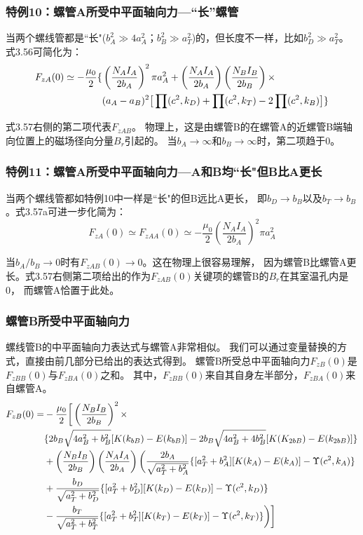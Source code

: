 \subsubsection{特例10：螺管A所受中平面轴向力---``长''螺管}
当两个螺线管都是``长"($b_A^2\gg 4a_A^2；b_B^2\gg a_T^2$)的，但长度不一样，比如$b_D^2\gg a_T^2$。
式3.56可简化为：
\begin{align}
F_{zA}(0)\simeq -\frac{\mu_0}{2}\{&\left(\frac{N_AI_A}{2b_A}\right)^2\pi a_A^2+\left(\frac{N_AI_A}{2b_A}\right)\left(\frac{N_BI_B}{2b_{B}}\right)\times\\\notag
&(a_A-a_B)^2\big[\prod(c^2,k_D)+\prod(c^2,k_T)-2\prod(c^2,k_B)\big]\}
\end{align}

式3.57右侧的第二项代表$F_{zAB}$。
物理上，这是由螺管B的在螺管A的近螺管B端轴向位置上的磁场径向分量$B_r$引起的。
当$b_A\rightarrow \infty$和$b_B\rightarrow \infty$时，第二项趋于0。

\subsubsection{特例11：螺管A所受中平面轴向力---A和B均``长"但B比A更长}
当两个螺线管都如特例10中一样是``长"的但B远比A更长，
即$b_D\rightarrow b_B$以及$b_T\rightarrow b_B$。式3.57a可进一步化简为：
\begin{equation*}
F_{zA}(0)\simeq F_{zAA}(0)\simeq -\frac{\mu_0}{2}\left(\frac{N_AI_A}{2b_A}\right)^2\pi a_A^2 \tag{3.57'}
\end{equation*}

当$b_A/b_B\rightarrow 0$时有$F_{zAB}(0)\rightarrow 0$。这在物理上很容易理解，
因为螺管B比螺管A更长。式3.57右侧第二项给出的作为$F_{zAB}(0)$关键项的螺管B的$B_r$在其室温孔内是0，
而螺管A恰置于此处。

\subsubsection{螺管B所受中平面轴向力}
螺线管B的中平面轴向力表达式与螺管A非常相似。
我们可以通过变量替换的方式，直接由前几部分已给出的表达式得到。
螺管B所受总中平面轴向力$F_{zB}(0)$是$F_{zBB}(0)$与$F_{zBA}(0)$之和。
其中，$F_{zBB}(0)$来自其自身左半部分，$F_{zBA}(0)$来自螺管A。
\begin{align}
F_{zB}(0)=&-\frac{\mu_0}{2}\bigg[\left(\frac{N_BI_B}{2b_B}\right)^2\times\\\notag
&\{2b_B\sqrt{4a_B^2+b_B^2}[K(k_{bB})-E(k_{bB})]-2b_B\sqrt{4a_B^2+4b_B^2}[K(K_{2bB})-E(k_{2bB})]\}\\\notag
&+\left(\frac{N_BI_B}{2b_B}\right)\left(\frac{N_AI_A}{2b_A}\right)\bigg(\frac{2b_A}{\sqrt{a_T^2+b_A^2}}\{[a_T^2+b_A^2][K(k_A)-E(k_A)]-\Upsilon(c^2,k_A)\}\\\notag
&+\frac{b_D}{\sqrt{a_T^2+b_D^2}}\{[a_T^2+b_D^2][K(k_D)-E(k_D)]-\Upsilon(c^2,k_D)\}\\\notag
&-\frac{b_T}{\sqrt{a_T^2+b_T^2}}\{[a_T^2+b_T^2][K(k_T)-E(k_T)]-\Upsilon(c^2,k_T)\}\bigg)\bigg]
\end{align}

